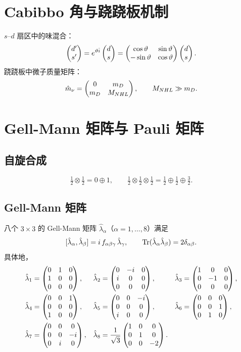 \section{Cabibbo 角与跷跷板机制}
\label{sec:1.4}

$s$--$d$ 扇区中的味混合：
\[
\begin{pmatrix}d' \\ s'\end{pmatrix} = e^{\vartheta\hat{i}}\begin{pmatrix}d \\ s\end{pmatrix}
= \begin{pmatrix}\cos\vartheta & \sin\vartheta \\ -\sin\vartheta & \cos\vartheta\end{pmatrix}\begin{pmatrix}d \\ s\end{pmatrix}.
\]
跷跷板中微子质量矩阵：
\[
\hat{m}_{\nu} = \begin{pmatrix}0 & m_{D} \\ m_{D} & M_{NHL}\end{pmatrix},\qquad M_{NHL}\gg m_{D}.
\]

\section{Gell-Mann 矩阵与 Pauli 矩阵}
\label{sec:1.5}

\subsection{自旋合成}

\[
\tfrac{1}{2}\otimes\tfrac{1}{2} = 0\oplus 1,\qquad
\tfrac{1}{2}\otimes\tfrac{1}{2}\otimes\tfrac{1}{2}
= \tfrac{1}{2}\oplus\tfrac{1}{2}\oplus\tfrac{3}{2}.
\]

\subsection{Gell-Mann 矩阵}

八个 $3\times 3$ 的 Gell-Mann 矩阵 $\hat{\lambda}_{\alpha}$（$\alpha=1,\dots,8$）满足
\[
[\hat{\lambda}_{\alpha},\hat{\lambda}_{\beta}] = i\,f_{\alpha\beta\gamma}\,\hat{\lambda}_{\gamma},\qquad
\operatorname{Tr}(\hat{\lambda}_{\alpha}\hat{\lambda}_{\beta}) = 2\delta_{\alpha\beta}.
\]
具体地，
\begin{align*}
\hat{\lambda}_{1}&=\begin{pmatrix}0&1&0\\1&0&0\\0&0&0\end{pmatrix},&
\hat{\lambda}_{2}&=\begin{pmatrix}0&-i&0\\i&0&0\\0&0&0\end{pmatrix},&
\hat{\lambda}_{3}&=\begin{pmatrix}1&0&0\\0&-1&0\\0&0&0\end{pmatrix},\\
\hat{\lambda}_{4}&=\begin{pmatrix}0&0&1\\0&0&0\\1&0&0\end{pmatrix},&
\hat{\lambda}_{5}&=\begin{pmatrix}0&0&-i\\0&0&0\\i&0&0\end{pmatrix},&
\hat{\lambda}_{6}&=\begin{pmatrix}0&0&0\\0&0&1\\0&1&0\end{pmatrix},\\
\hat{\lambda}_{7}&=\begin{pmatrix}0&0&0\\0&0&-i\\0&i&0\end{pmatrix},&
\hat{\lambda}_{8}&=\frac{1}{\sqrt{3}}\begin{pmatrix}1&0&0\\0&1&0\\0&0&-2\end{pmatrix}.
\end{align*}

